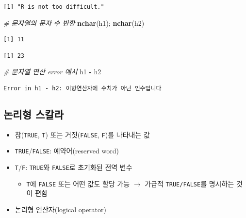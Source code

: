 \documentclass[
  11pt,
]{krantz}
\newenvironment{Shaded}{\begin{snugshade}}{\end{snugshade}}
\newcommand{\CommentTok}[1]{\textcolor[rgb]{0.37,0.37,0.37}{\textit{#1}}}
\newcommand{\KeywordTok}[1]{\textcolor[rgb]{0.27,0.27,0.27}{\textbf{#1}}}
\newcommand{\NormalTok}[1]{#1}
\newcommand{\OperatorTok}[1]{\textcolor[rgb]{0.43,0.43,0.43}{\textbf{#1}}}
\newcommand{\StringTok}[1]{\textcolor[rgb]{0.5,0.5,0.5}{#1}}
\providecommand{\tightlist}{%
  \setlength{\itemsep}{0pt}\setlength{\parskip}{0pt}}
\begin{document}
\begin{verbatim}
[1] "R is not too difficult."
\end{verbatim}

\begin{Shaded}
\begin{Highlighting}[]
\CommentTok{# 문자열의 문자 수 반환}
\KeywordTok{nchar}\NormalTok{(h1); }\KeywordTok{nchar}\NormalTok{(h2)}
\end{Highlighting}
\end{Shaded}

\begin{verbatim}
[1] 11
\end{verbatim}

\begin{verbatim}
[1] 23
\end{verbatim}

\begin{Shaded}
\begin{Highlighting}[]
\CommentTok{# 문자열 연산 error 예시}
\NormalTok{h1 }\OperatorTok{-}\StringTok{ }\NormalTok{h2}
\end{Highlighting}
\end{Shaded}

\begin{verbatim}
Error in h1 - h2: 이항연산자에 수치가 아닌 인수입니다
\end{verbatim}

\normalsize

\hypertarget{logical}{%
\subsection{논리형 스칼라}\label{logical}}

\begin{itemize}
\tightlist
\item
  참(\texttt{TRUE}, \texttt{T}) 또는 거짓(\texttt{FALSE}, \texttt{F})를 나타내는 값
\item
  \texttt{TRUE}/\texttt{FALSE}: 예약어(reserved word)
\item
  \texttt{T}/\texttt{F}: \texttt{TRUE}와 \texttt{FALSE}로 초기화된 전역 변수

  \begin{itemize}
  \tightlist
  \item
    \texttt{T}에 \texttt{FALSE} 또는 어떤 값도 할당 가능 \(\rightarrow\) 가급적 \texttt{TRUE/FALSE}를 명시하는 것이 편함
  \end{itemize}
\item
  논리형 연산자(logical operator)
\end{itemize}
\end{document}
